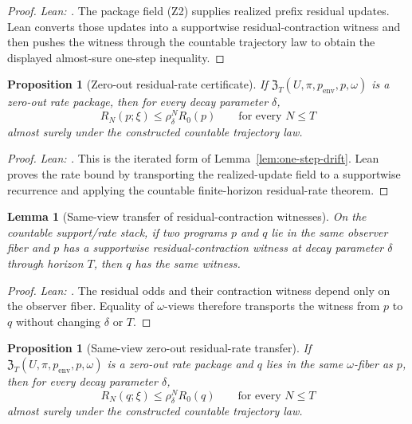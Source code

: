 \documentclass[11pt]{article}
\newtheorem{proposition}[theorem]{Proposition}
\newtheorem{lemma}[theorem]{Lemma}
\theoremstyle{definition}
\theoremstyle{remark}
\theoremstyle{plain}
\theoremstyle{definition}
\begin{document}
\begin{proof}
\noindent\emph{Lean: .}
The package field \textup{(Z2)} supplies realized prefix residual updates. Lean converts those updates into a supportwise residual-contraction witness and then pushes the witness through the countable trajectory law to obtain the displayed almost-sure one-step inequality.
\end{proof}

\begin{proposition}[Zero-out residual-rate certificate]
\label{prop:exp-rate}
If $\mathfrak Z_T(U,\pi,p_{\mathrm{env}},p,\omega)$ is a zero-out rate package, then for every decay parameter $\delta$,
\[
R_N(p;\xi)\le \rho_\delta^N R_0(p)
\qquad
\text{for every }N\le T
\]
almost surely under the constructed countable trajectory law.
\end{proposition}

\begin{proof}
\noindent\emph{Lean: .}
This is the iterated form of Lemma~\ref{lem:one-step-drift}. Lean proves the rate bound by transporting the realized-update field to a supportwise recurrence and applying the countable finite-horizon residual-rate theorem.
\end{proof}

\begin{lemma}[Same-view transfer of residual-contraction witnesses]
\label{lem:one-step-drift-kernel}
On the countable support/rate stack, if two programs $p$ and $q$ lie in the same observer fiber and $p$ has a supportwise residual-contraction witness at decay parameter $\delta$ through horizon $T$, then $q$ has the same witness.
\end{lemma}

\begin{proof}
\noindent\emph{Lean: .}
The residual odds and their contraction witness depend only on the observer fiber. Equality of $\omega$-views therefore transports the witness from $p$ to $q$ without changing $\delta$ or $T$.
\end{proof}

\begin{proposition}[Same-view zero-out residual-rate transfer]
\label{prop:kernel-exp-rate}
If $\mathfrak Z_T(U,\pi,p_{\mathrm{env}},p,\omega)$ is a zero-out rate package and $q$ lies in the same $\omega$-fiber as $p$, then for every decay parameter $\delta$,
\[
R_N(q;\xi)\le \rho_\delta^N R_0(q)
\qquad
\text{for every }N\le T
\]
almost surely under the constructed countable trajectory law.
\end{proposition}
\end{document}

